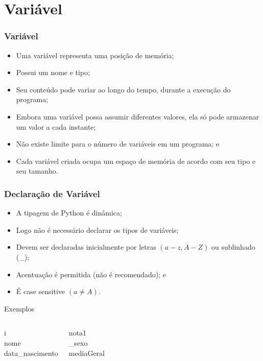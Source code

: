 \documentclass{beamer}
\begin{document}
\section{Variável}

\begin{frame}
\frametitle{Variável}

\begin{itemize}
	\item Uma variável representa uma posição de memória;
	\item Possui um nome e tipo;
	\item Seu conteúdo pode variar ao longo do tempo, durante a execução do
	programa;
	\item Embora uma variável possa assumir diferentes valores, ela só pode
	armazenar um valor a cada instante;
	\item Não existe limite para o número de variáveis em um programa; e
	\item Cada variável criada ocupa um espaço de memória de acordo com seu
	tipo e seu tamanho.
\end{itemize}

\end{frame}

\begin{frame}
\frametitle{Declaração de Variável}

\begin{itemize}
	\item A tipagem de Python é dinâmica;
	\item Logo não é necessário declarar os tipos de variáveis;
	\item Devem ser declaradas inicialmente por letras $(a - z, A - Z)$ ou sublinhado (\_);
	\item Acentuação é permitida (\alert{não é recomendado}); e
	\item É case sensitive $(a \neq A)$.
\end{itemize}\vfill

\begin{exampleblock}{Exemplos}
\begin{columns}[c] 
	i\\
	nome\\
	data\_nascimento
	
	nota1\\
	\_sexo\\
	mediaGeral
\end{columns}
\end{exampleblock}
\end{frame}
\end{document}
